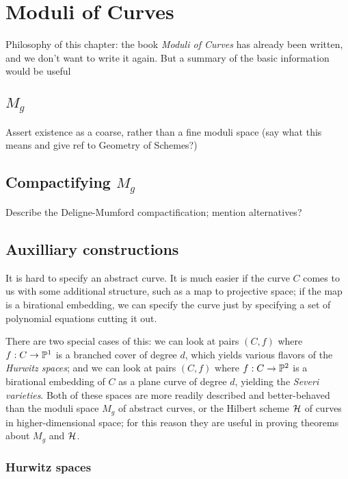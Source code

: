 

\chapter{Moduli of Curves}
\label{Moduli chapter}

Philosophy of this chapter: the book \emph{Moduli of Curves} has already been written, and we don't want to write it again. But a summary of the basic information would be useful

\section{$M_g$}

Assert existence as a coarse, rather than a fine moduli space (say what this means and give ref to Geometry of Schemes?)

\section{Compactifying $M_g$}

Describe the Deligne-Mumford compactification; mention alternatives?

\section{Auxilliary constructions}

It is hard to specify an abstract curve. It is much easier if the curve $C$ comes to us with some additional structure, such as a map to projective space; if the map is a birational embedding, we can specify the curve just by specifying a set of polynomial equations cutting it out. 

There are two special cases of this: we can look at pairs $(C,f)$ where $f : C \to {\mathbb P}^1$ is a branched cover of degree $d$, which yields various flavors of the \emph{Hurwitz spaces}; and we can look at pairs $(C,f)$ where $f : C \to {\mathbb P}^2$ is a birational embedding of $C$ as a plane curve of degree $d$, yielding the \emph{Severi varieties}. Both of these spaces are more readily described and better-behaved than the moduli space $M_g$ of abstract curves, or the Hilbert scheme ${\cal H}$ of curves in higher-dimensional space; for this reason they are useful in proving theorems about $M_g$ and ${\cal H}$.

\subsection{Hurwitz spaces}

